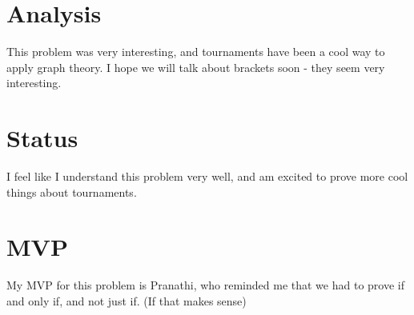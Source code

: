\documentclass[11pt]{article} %
\begin{document}
\section{Analysis}
This problem was very interesting, and tournaments have been a cool way to apply graph theory. I hope we will talk about brackets soon - they seem very interesting. 
\section{Status}
I feel like I understand this problem very well, and am excited to prove more cool things about tournaments. 
\section{MVP}
My MVP for this problem is Pranathi, who reminded me that we had to prove if and only if, and not just if. (If that makes sense)
\end{document}
